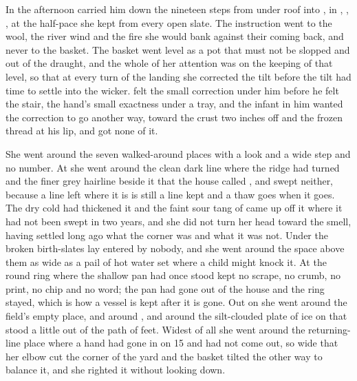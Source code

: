 In the afternoon  carried him down the nineteen steps from under  roof into , in , , , at the half-pace she kept from every open slate. The instruction went to the wool, the river wind and the fire she would bank against their coming back, and never to the basket. The basket went level as a pot that must not be slopped and out of the draught, and the whole of her attention was on the keeping of that level, so that at every turn of the landing she corrected the tilt before the tilt had time to settle into the wicker.  felt the small correction under him before he felt the stair, the hand's small exactness under a tray, and the infant in him wanted the correction to go another way, toward the crust two inches off and the frozen thread at his lip, and got none of it.

She went around the seven walked-around places with a look and a wide step and no number. At  she went around the clean dark line where the ridge had turned and the finer grey hairline beside it that the house called , and swept neither, because a line left where it is is still a line kept and a thaw goes when it goes. The dry cold had thickened it and the faint sour tang of  came up off it where it had not been swept in two years, and she did not turn her head toward the smell, having settled long ago what the corner was and what it was not. Under  the broken birth-slates lay entered by nobody, and she went around the space above them as wide as a pail of hot water set where a child might knock it. At  the round ring where the shallow pan had once stood kept no scrape, no crumb, no print, no chip and no word; the pan had gone out of the house and the ring stayed, which is how a vessel is kept after it is gone. Out on  she went around the field's empty place, and around , and around the silt-clouded plate of ice on  that stood a little out of the path of feet. Widest of all she went around the returning-line place where a hand had gone in on  15 and had not come out, so wide that her elbow cut the corner of the yard and the basket tilted the other way to balance it, and she righted it without looking down.

